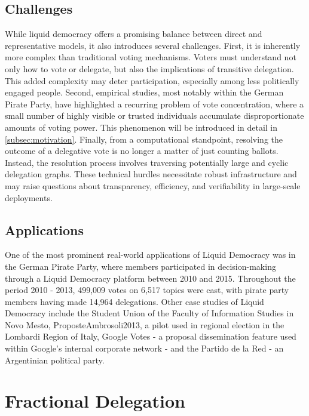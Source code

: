\subsection{Challenges}

While liquid democracy offers a promising balance between direct and representative models, it also introduces several challenges. First, it is inherently more complex than traditional voting mechanisms. Voters must understand not only how to vote or delegate, but also the implications of transitive delegation. This added complexity may deter participation, especially among less politically engaged people. Second, empirical studies, most notably within the German Pirate Party, have highlighted a recurring problem of vote concentration, where a small number of highly visible or trusted individuals accumulate disproportionate amounts of voting power. This phenomenon will be introduced in detail in \cref{subsec:motivation}. Finally, from a computational standpoint, resolving the outcome of a delegative vote is no longer a matter of just counting ballots. Instead, the resolution process involves traversing potentially large and cyclic delegation graphs. These technical hurdles necessitate robust infrastructure and may raise questions about transparency, efficiency, and verifiability in large-scale deployments.

\subsection{Applications}

One of the most prominent real-world applications of Liquid Democracy was in the German Pirate Party, where members participated in decision-making through a Liquid Democracy platform between 2010 and 2015. \cite{paulinOverviewTenYears2020} Throughout the period 2010 - 2013, 499,009 votes on 6,517 topics were cast, with pirate party members having made 14,964 delegations. \cite{klingVotingBehaviourPower2015} Other case studies of Liquid Democracy include the Student Union of the Faculty of Information Studies in Novo Mesto, ProposteAmbrosoli2013, a pilot used in regional election in the Lombardi Region of Italy, Google Votes - a proposal dissemination feature used within Google’s internal corporate network - and the Partido de la Red - an Argentinian political party. \cite{paulinOverviewTenYears2020}

\section{Fractional Delegation}

